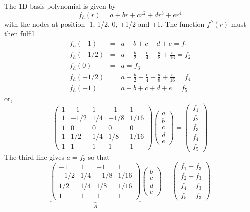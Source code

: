 The 1D basis polynomial is given by
\[
f_h(r)=a+br+cr^2+dr^3+er^4
\]
with the nodes at position -1,-1/2, 0, +1/2 and +1.
The function $f^h(r)$ must then fulfil 
\begin{eqnarray}
f_h(-1)   &=& a-b+c-d+e = f_1 \nonumber\\
f_h(-1/2) &=& a-\frac{b}{2}+\frac{c}{4}-\frac{d}{8}+\frac{e}{16} = f_2 \nonumber\\
f_h(0)    &=& a = f_3 \nonumber\\
f_h(+1/2) &=& a-\frac{b}{2}+\frac{c}{4}-\frac{d}{8}+\frac{e}{16} = f_4 \nonumber\\
f_h(+1)   &=& a+b+c+d+e = f_5 \nonumber
\end{eqnarray}
or, 
\begin{equation}
\left(
\begin{array}{ccccc}
 1  &  -1  &  1 &  -1 &  1 \\ 
 1  &  -1/2  &  1/4 &  -1/8 &  1/16 \\ 
 1  &   0    &  0   &   0   & 0 \\
 1  &  1/2  &  1/4 &  1/8 &  1/16 \\ 
 1  &  1  &  1 &  1 &  1 
\end{array}
\right)
\left(
\begin{array}{c}
a \\ b \\ c \\ d \\ e
\end{array}
\right)
=
\left(
\begin{array}{c}
f_1 \\ f_2 \\ f_3 \\ f_4 \\ f_5
\end{array}
\right)
\end{equation}
The third line gives $a=f_3$ so that
\begin{equation}
\underbrace{
\left(
\begin{array}{ccccc}
-1  &  1   &  -1 &  1 \\ 
-1/2 &  1/4 & -1/8 &  1/16 \\ 
 1/2 &  1/4 &  1/8 &  1/16 \\ 
 1  &  1   &  1 &  1 
\end{array}
\right)}_{A}
\left(
\begin{array}{c}
b \\ c  \\ d \\ e
\end{array}
\right)
=
\left(
\begin{array}{c}
f_1 -f_3 \\ f_2 -f_3\\ f_4-f_3 \\ f_5 -f_3
\end{array}
\right)
\end{equation}
